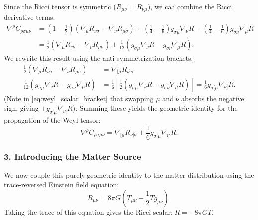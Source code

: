 \documentclass[11pt, a4paper]{report}
\begin{document}
Since the Ricci tensor is symmetric ($R_{\mu\nu} = R_{\nu\mu}$), we can combine the Ricci derivative terms:
\begin{align}
\nabla^{\rho}C_{\rho\sigma\mu\nu} &= \left( 1 - \frac{1}{2} \right) \left( \nabla_{\mu}R_{\nu\sigma} - \nabla_{\nu}R_{\mu\sigma} \right) + \left( \frac{1}{4} - \frac{1}{6} \right) g_{\sigma\mu}\nabla_{\nu}R - \left( \frac{1}{4} - \frac{1}{6} \right) g_{\sigma\nu}\nabla_{\mu}R \nonumber \\
&= \frac{1}{2} \left( \nabla_{\mu}R_{\nu\sigma} - \nabla_{\nu}R_{\mu\sigma} \right) + \frac{1}{12} \left( g_{\sigma\mu}\nabla_{\nu}R - g_{\sigma\nu}\nabla_{\mu}R \right).
\end{align}
We rewrite this result using the anti-symmetrization brackets:
\begin{align}
\frac{1}{2} \left( \nabla_{\mu}R_{\nu\sigma} - \nabla_{\nu}R_{\mu\sigma} \right) &= \nabla_{[\mu}R_{\nu]\sigma} \\
\frac{1}{12} \left( g_{\sigma\mu}\nabla_{\nu}R - g_{\sigma\nu}\nabla_{\mu}R \right) &= \frac{1}{6} \left[ \frac{1}{2} \left( g_{\sigma\mu}\nabla_{\nu}R - g_{\sigma\nu}\nabla_{\mu}R \right) \right] = \frac{1}{6} g_{\sigma[\mu}\nabla_{\nu]}R. \label{eq:weyl_scalar_bracket}
\end{align}
(Note in \eqref{eq:weyl_scalar_bracket} that swapping $\mu$ and $\nu$ absorbs the negative sign, giving $+g_{\sigma[\mu}\nabla_{\nu]}R$). Summing these yields the geometric identity for the propagation of the Weyl tensor:
\begin{equation}
\label{eq:weyl_geometric_divergence}
\nabla^{\rho}C_{\rho\sigma\mu\nu} = \nabla_{[\mu} R_{\nu]\sigma} + \frac{1}{6} g_{\sigma[\mu} \nabla_{\nu]} R.
\end{equation}

\subsubsection*{3. Introducing the Matter Source}
We now couple this purely geometric identity to the matter distribution using the trace-reversed Einstein field equation:
\begin{equation}
R_{\mu\nu} = 8\pi G \left( T_{\mu\nu} - \frac{1}{2}T g_{\mu\nu} \right).
\end{equation}
Taking the trace of this equation gives the Ricci scalar: $R = -8\pi G T$. 
\end{document}
